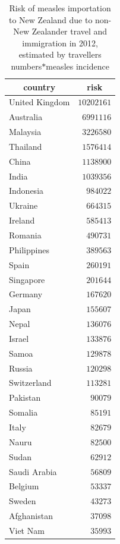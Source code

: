\documentclass{article}
\begin{document}
\begin{table}
\caption{Risk of measles importation to New Zealand due to non-New Zealander travel and immigration in 2012, estimated by travellers numbers$*$measles incidence}
\begin{center}
\begin{tabular}{lr}
\hline\hline
\multicolumn{1}{c}{country}&\multicolumn{1}{c}{risk}\tabularnewline
\hline
United Kingdom&$10202161$\tabularnewline
Australia&$ 6991116$\tabularnewline
Malaysia&$ 3226580$\tabularnewline
Thailand&$ 1576414$\tabularnewline
China&$ 1138900$\tabularnewline
India&$ 1039356$\tabularnewline
Indonesia&$  984022$\tabularnewline
Ukraine&$  664315$\tabularnewline
Ireland&$  585413$\tabularnewline
Romania&$  490731$\tabularnewline
Philippines&$  389563$\tabularnewline
Spain&$  260191$\tabularnewline
Singapore&$  201644$\tabularnewline
Germany&$  167620$\tabularnewline
Japan&$  155607$\tabularnewline
Nepal&$  136076$\tabularnewline
Israel&$  133876$\tabularnewline
Samoa&$  129878$\tabularnewline
Russia&$  120298$\tabularnewline
Switzerland&$  113281$\tabularnewline
Pakistan&$   90079$\tabularnewline
Somalia&$   85191$\tabularnewline
Italy&$   82679$\tabularnewline
Nauru&$   82500$\tabularnewline
Sudan&$   62912$\tabularnewline
Saudi Arabia&$   56809$\tabularnewline
Belgium&$   53337$\tabularnewline
Sweden&$   43273$\tabularnewline
Afghanistan&$   37098$\tabularnewline
Viet Nam&$   35993$\tabularnewline
\hline
\end{tabular}\end{center}\label{table:imrisk12}
\end{table}
\end{document}
